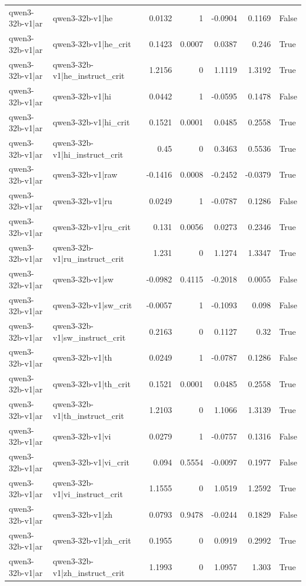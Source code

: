 \begin{table}
\begin{tabular}{l l r r r r l}
qwen3-32b-v1|ar & qwen3-32b-v1|he & 0.0132 & 1 & -0.0904 & 0.1169 & False \\
qwen3-32b-v1|ar & qwen3-32b-v1|he_crit & 0.1423 & 0.0007 & 0.0387 & 0.246 & True \\
qwen3-32b-v1|ar & qwen3-32b-v1|he_instruct_crit & 1.2156 & 0 & 1.1119 & 1.3192 & True \\
qwen3-32b-v1|ar & qwen3-32b-v1|hi & 0.0442 & 1 & -0.0595 & 0.1478 & False \\
qwen3-32b-v1|ar & qwen3-32b-v1|hi_crit & 0.1521 & 0.0001 & 0.0485 & 0.2558 & True \\
qwen3-32b-v1|ar & qwen3-32b-v1|hi_instruct_crit & 0.45 & 0 & 0.3463 & 0.5536 & True \\
qwen3-32b-v1|ar & qwen3-32b-v1|raw & -0.1416 & 0.0008 & -0.2452 & -0.0379 & True \\
qwen3-32b-v1|ar & qwen3-32b-v1|ru & 0.0249 & 1 & -0.0787 & 0.1286 & False \\
qwen3-32b-v1|ar & qwen3-32b-v1|ru_crit & 0.131 & 0.0056 & 0.0273 & 0.2346 & True \\
qwen3-32b-v1|ar & qwen3-32b-v1|ru_instruct_crit & 1.231 & 0 & 1.1274 & 1.3347 & True \\
qwen3-32b-v1|ar & qwen3-32b-v1|sw & -0.0982 & 0.4115 & -0.2018 & 0.0055 & False \\
qwen3-32b-v1|ar & qwen3-32b-v1|sw_crit & -0.0057 & 1 & -0.1093 & 0.098 & False \\
qwen3-32b-v1|ar & qwen3-32b-v1|sw_instruct_crit & 0.2163 & 0 & 0.1127 & 0.32 & True \\
qwen3-32b-v1|ar & qwen3-32b-v1|th & 0.0249 & 1 & -0.0787 & 0.1286 & False \\
qwen3-32b-v1|ar & qwen3-32b-v1|th_crit & 0.1521 & 0.0001 & 0.0485 & 0.2558 & True \\
qwen3-32b-v1|ar & qwen3-32b-v1|th_instruct_crit & 1.2103 & 0 & 1.1066 & 1.3139 & True \\
qwen3-32b-v1|ar & qwen3-32b-v1|vi & 0.0279 & 1 & -0.0757 & 0.1316 & False \\
qwen3-32b-v1|ar & qwen3-32b-v1|vi_crit & 0.094 & 0.5554 & -0.0097 & 0.1977 & False \\
qwen3-32b-v1|ar & qwen3-32b-v1|vi_instruct_crit & 1.1555 & 0 & 1.0519 & 1.2592 & True \\
qwen3-32b-v1|ar & qwen3-32b-v1|zh & 0.0793 & 0.9478 & -0.0244 & 0.1829 & False \\
qwen3-32b-v1|ar & qwen3-32b-v1|zh_crit & 0.1955 & 0 & 0.0919 & 0.2992 & True \\
qwen3-32b-v1|ar & qwen3-32b-v1|zh_instruct_crit & 1.1993 & 0 & 1.0957 & 1.303 & True \\

\end{tabular}
\end{table}
